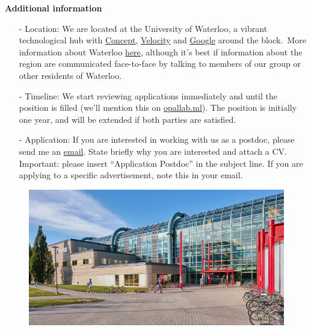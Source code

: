 \documentclass[12pt]{article}
\begin{document}

\noindent \textbf{Additional information}
\begin{itemize}
	\item[-] Location: We are located at the University of Waterloo, a vibrant technological hub with \href{https://concept.uwaterloo.ca}{Concept}, \href{https://velocityincubator.com}{Velocity} and \href{https://careers.google.com/locations/waterloo/}{Google} around the block.\ More information about Waterloo \href{https://www.waterloo.ca/en/index.aspx#}{here}, although it's best if information about the region are communicated face-to-face by talking to members of our group or other residents of Waterloo.\vspace{-0.3cm}
	\item[-] Timeline: We start reviewing applications immediately and until the position is filled (we'll mention this on \url{opallab.ml}). The position is initially one year, and will be extended if both parties are satisfied.\vspace{-0.3cm}
	\item[-] Application: If you are interested in working with us as a postdoc, please send me an \href{mailto:kimon.fountoulakis@uwaterloo.ca}{email}. State briefly why you are interested and attach a CV. Important: please insert ``Application Postdoc'' in the subject line. If you are applying to a specific advertisement, note this in your email.
\end{itemize}


\begin{figure}[htb]
  \center
  \includegraphics[scale=2.0]{davis-centre-750.jpg}
\end{figure}
\end{document}
